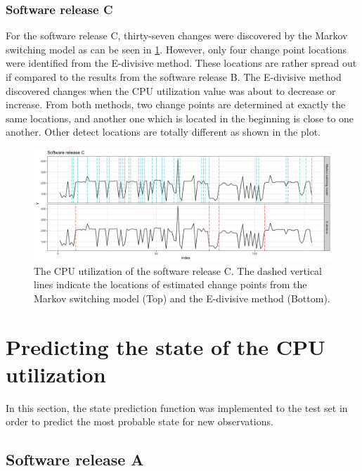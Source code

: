 \subsubsection{Software release C}

For the software release C, thirty-seven changes were discovered by
the Markov switching model as can be seen in \ref{compare_L17A}.
However, only four change point locations were identified from the
E-divisive method. These locations are rather spread out if compared
to the results from the software release B. The E-divisive method
discovered changes when the CPU utilization value was about to decrease
or increase. From both methods, two change points are determined at
exactly the same locations, and another one which is located in the
beginning is close to one another. Other detect locations are totally
different as shown in the plot. 

\begin{figure}[H]
\begin{centering}
\includegraphics[scale=0.35]{picture/compare_L17A}
\par\end{centering}
\caption{The CPU utilization of the software release C. The dashed vertical
lines indicate the locations of estimated change points from the Markov
switching model (Top) and the E-divisive method (Bottom). }

\label{compare_L17A}
\end{figure}


\section{Predicting the state of the CPU utilization \label{sec:Predict}}

In this section, the state prediction function was implemented to
the test set in order to predict the most probable state for new observations. 

\subsection{Software release A}

